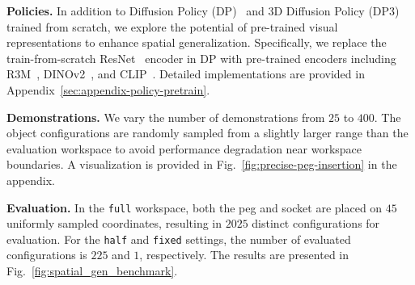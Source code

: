 \vspace{0.2cm} \noindent\textbf{Policies.} In addition to Diffusion Policy (DP)~\cite{chi2023diffusion_policy} and 3D Diffusion Policy (DP3)~\cite{ze20243d} trained from scratch, we explore the potential of pre-trained visual representations to enhance spatial generalization. Specifically, we replace the train-from-scratch ResNet~\cite{he2016deep} encoder in DP with pre-trained encoders including R3M~\cite{nair2023r3m}, DINOv2~\cite{oquab2023dinov2}, and CLIP~\cite{radford2021learning}. 
Detailed implementations are provided in Appendix~\ref{sec:appendix-policy-pretrain}.

\vspace{0.2cm} \noindent\textbf{Demonstrations.}
We vary the number of demonstrations from $25$ to $400$. The object configurations are randomly sampled from a slightly larger range than the evaluation workspace to avoid performance degradation near workspace boundaries. A visualization is provided in Fig.~\ref{fig:precise-peg-insertion} in the appendix.

\vspace{0.2cm} \noindent\textbf{Evaluation.}
In the \texttt{full} workspace, both the peg and socket are placed on $45$ uniformly sampled coordinates, resulting in $2025$ distinct configurations for evaluation. For the \texttt{half} and \texttt{fixed} settings, the number of evaluated configurations is $225$ and $1$, respectively. The results are presented in Fig.~\ref{fig:spatial_gen_benchmark}.

